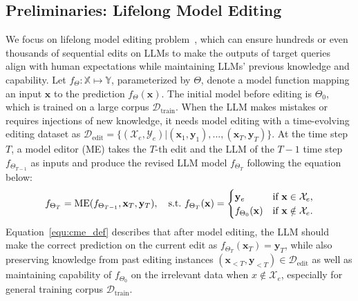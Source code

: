 \documentclass{article}
\begin{document}
\subsection{Preliminaries: Lifelong Model Editing}
We focus on lifelong model editing problem~\cite{grace,t-patcher}, which can ensure hundreds or even thousands of sequential edits on LLMs to make the outputs of target queries align with human expectations while maintaining LLMs' previous knowledge and capability. 
Let $f_{\Theta}: \mathbb{X} \mapsto \mathbb{Y}$, parameterized by $\Theta$, denote a model function mapping an input $\mathbf{x}$ to the prediction $f_{\Theta}(\mathbf{x})$.
The initial model before editing is $\Theta_0$, which is trained on a large corpus $\mathcal{D}_{\text{train}}$. 
When the LLM makes mistakes or requires injections of new knowledge, it needs model editing with a time-evolving editing dataset as $\mathcal{D}_{\text{edit}}= \{(\mathcal{X}_e, \mathcal{Y}_e) \vert (\mathbf{x}_1, \mathbf{y}_1), ..., (\mathbf{x}_T, \mathbf{y}_T)\}$. 
At the time step $T$, a model editor (ME) takes the $T$-th edit and the LLM of the $T-1$ time step $f_{\Theta_{T-1}}$ as inputs and produce the revised LLM model $f_{\Theta_T}$ following the equation below:
\begin{equation}
 \label{equ:cme_def}
    f_{\Theta_{T}}={\rm ME}(f_{\Theta_{T-1}},\mathbf{x}_T,\mathbf{y}_T), \quad \text{s.t.}\
    f_{\Theta_{T}}(\mathbf{x}) = 
   \begin{cases}
    \mathbf{y}_e &\mbox{if $\mathbf{x} \in \mathcal{X}_e$,}\\
    f_{\Theta_0}(\mathbf{x})&\mbox{if $\mathbf{x} \notin \mathcal{X}_e$.}
    \end{cases}
\end{equation}
Equation~\ref{equ:cme_def} describes that after model editing, the LLM should make the correct prediction on the current edit as $f_{\Theta_{T}}(\mathbf{x}_T) = \mathbf{y}_T$, while also preserving knowledge from past editing instances $(\mathbf{x}_{<T}, \mathbf{y}_{<T}) \in \mathcal{D}_{\text{edit}}$ as well as maintaining capability of $f_{\Theta_0}$ on the irrelevant data when $x \notin \mathcal{X}_e$, especially for general training corpus $\mathcal{D}_{\text{train}}$.
\end{document}
